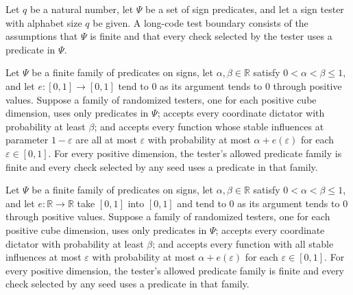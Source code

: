 \begin{definition}
\label{FABL.LongCodeTestBoundary}
\leanok
{}
Let $q$ be a natural number, let $\Psi$ be a set of sign predicates, and let a sign
tester with alphabet size $q$ be given. A long-code test boundary consists of the
assumptions that $\Psi$ is finite and that every check selected by the tester uses a
predicate in $\Psi$.
\end{definition}

\begin{theorem}
\label{FABL.IsDictatorVsNoNotablesTest.longCodeTestBoundary}
\leanok
{}
Let $\Psi$ be a finite family of predicates on signs, let $\alpha,\beta\in\mathbb R$
satisfy $0<\alpha<\beta\le 1$, and let $e:[0,1]\to[0,1]$ tend to $0$ as its argument
tends to $0$ through positive values. Suppose a family of randomized testers, one for
each positive cube dimension, uses only predicates in $\Psi$; accepts every coordinate
dictator with probability at least $\beta$; and accepts every function whose stable
influences at parameter $1-\varepsilon$ are all at most $\varepsilon$ with probability
at most $\alpha+e(\varepsilon)$ for each $\varepsilon\in[0,1]$. For every positive
dimension, the tester's allowed predicate family is finite and every check selected by
any seed uses a predicate in that family.
\end{theorem}

\begin{theorem}
\label{FABL.IsDictatorVsNoInfluentialsTest.longCodeTestBoundary}
\leanok
{}
Let $\Psi$ be a finite family of predicates on signs, let $\alpha,\beta\in\mathbb R$
satisfy $0<\alpha<\beta\le 1$, and let $e:\mathbb R\to\mathbb R$ take $[0,1]$ into
$[0,1]$ and tend to $0$ as its argument tends to $0$ through positive values. Suppose a
family of randomized testers, one for each positive cube dimension, uses only predicates
in $\Psi$; accepts every coordinate dictator with probability at least $\beta$; and
accepts every function with all stable influences at most $\varepsilon$ with probability
at most $\alpha+e(\varepsilon)$ for each $\varepsilon\in[0,1]$. For every positive
dimension, the tester's allowed predicate family is finite and every check selected by
any seed uses a predicate in that family.
\end{theorem}

